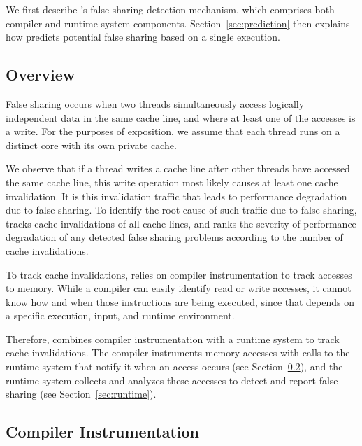 \label{sec:detection}

We first describe \Predator{}'s false sharing detection mechanism, which comprises both compiler and runtime system
components. Section~\ref{sec:prediction} then explains how \Predator{} predicts potential false sharing based on a single execution.

\subsection{Overview}
\label{sec:overview}

False sharing occurs when two threads
simultaneously access logically independent data in the same cache line, and where at least one of the accesses is a write.
For the purposes of exposition, we assume that each thread runs on a distinct core with its own private cache.

We observe that 
if a thread writes a cache line after other threads have 
accessed the same cache line, this write operation most likely causes at least one cache invalidation. It is this invalidation traffic that leads to performance degradation due to false sharing. To identify the root cause of such traffic due to false sharing, \Predator{} tracks cache invalidations of all cache lines, and ranks the severity of performance degradation of any detected false sharing problems according to the number of cache invalidations. 
 


To track cache invalidations, \Predator{} relies on compiler instrumentation to track accesses to memory. While a compiler can easily identify read or write accesses, it cannot know how and when those instructions are being executed, since that depends on a specific execution, input, and runtime environment.

Therefore, \Predator{} combines compiler instrumentation with a runtime system to track cache invalidations. The compiler
instruments memory accesses with calls to the runtime system that notify it when an access occurs (see Section~\ref{sec:compiler}), and the runtime system collects and analyzes these accesses to detect and report false sharing (see Section~\ref{sec:runtime}).

\subsection{Compiler Instrumentation}
\label{sec:compiler}


